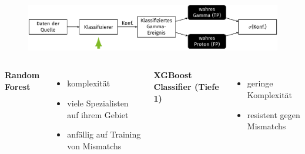 \documentclass[aspectratio=1610, professionalfonts, 9pt]{beamer}
\begin{document}
\begin{frame}
  \begin{minipage}[t][0.3\textheight][t]{\textwidth}
	\begin{figure}
	  \includegraphics[scale=0.5]{./tikz/Conf/Conf2.pdf}
	\end{figure}
  \end{minipage}
  \begin{minipage}[t][0.7\textheight][t]{\textwidth}
	\begin{columns}[onlytextwidth]
	  \Large \bf Random Forest
	  \begin{itemize}
		\item komplexität
		\item viele Spezialisten auf ihrem Gebiet
		\item anfällig auf Training von Mismatchs
	  \end{itemize}
	  \Large \bf XGBoost Classifier (Tiefe 1)
	  \begin{itemize}
		\item geringe Komplexität
		\item resistent gegen Mismatchs
	  \end{itemize}
	\end{columns}
  \end{minipage}
\end{frame}
\end{document}
